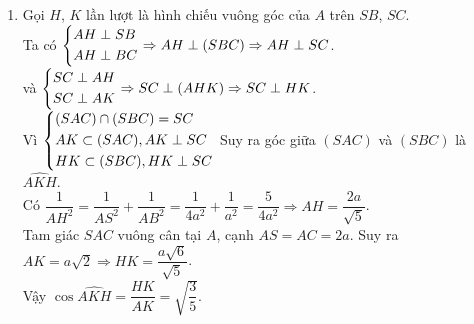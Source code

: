 \begin{bt}
{\begin{enumerate}
	Suy ra $(P)\cap (ABC)=MN$ với $N\in AB$, $MN\parallel BC$.\\
	Tương tự $(P)$ đi qua $N$, $(P)$ vuông góc với $AB$ nên $(P)$ song song với $SA$.\\
	Suy ra $(P)\cap (SAB)=NP$ với $P\in SB$, $NP\parallel SA$.\\
	Vì $(P)\parallel BC$ nên $(P)\cap (SBC)=PQ$ với $PQ\parallel BC$, $Q\in SC$.\\
	$(P)\cap (SAC)=QM$. Do $SA\perp BC$ nên $MN\perp NP$.\\
	Vậy thiết diện của hình chóp cắt bởi mặt phẳng $(P)$ là hình chữ nhật $MNPQ$.\\
	Có $MN=\dfrac{1}{3}BC=\dfrac{1}{3}a\sqrt 3$, $NP=\dfrac{2}{3}SA=\dfrac{4a}{3}$.\\
	Vậy $S_{MNPQ}=\dfrac{a\sqrt 3}{3}\cdot \dfrac{4a}{3}=\dfrac{4a^2\sqrt 3}{9}$.
	\item Gọi $H$, $K$ lần lượt là hình chiếu vuông góc của $A$ trên $SB$, $SC$.\\
	Ta có $\left\{\begin{aligned}&AH\perp SB\\ &AH\perp BC\end{aligned}\right.\Rightarrow AH\perp (SBC)\Rightarrow AH\perp SC$.\\
	và $\left\{\begin{aligned}&SC\perp AH\\ &SC\perp AK\end{aligned}\right.\Rightarrow SC\perp (AHK)\Rightarrow SC\perp HK$.\\
	Vì $\left\{\begin{aligned}&(SAC)\cap (SBC)=SC\\ &AK\subset (SAC), AK\perp SC\\ &HK\subset (SBC), HK\perp SC\end{aligned}\right.$ Suy ra góc giữa $(SAC)$ và $(SBC)$ là $\widehat{AKH}$.\\
	Có $\dfrac{1}{AH^2}=\dfrac{1}{AS^2}+\dfrac{1}{AB^2}=\dfrac{1}{4a^2}+\dfrac{1}{a^2}=\dfrac{5}{4a^2}\Rightarrow AH=\dfrac{2a}{\sqrt 5}$.\\
	Tam giác $SAC$ vuông cân tại $A$, cạnh $AS=AC=2a$. Suy ra $AK=a\sqrt 2\Rightarrow HK=\dfrac{a\sqrt 6}{\sqrt 5}$.\\
	Vậy $\cos\widehat{AKH}=\dfrac{HK}{AK}=\sqrt{\dfrac{3}{5}}$.
\end{enumerate}
}
\end{bt}

